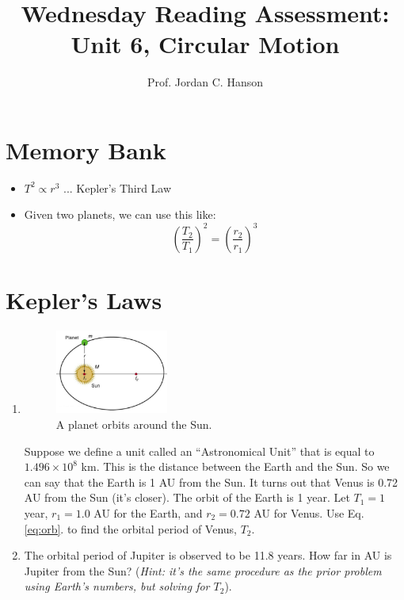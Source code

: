 \documentclass{article}
\begin{document}
\title{Wednesday Reading Assessment: Unit 6, Circular Motion}
\author{Prof. Jordan C. Hanson}

\maketitle

\section{Memory Bank}

\begin{itemize}
\item $T^2 \propto r^3$ ... Kepler's Third Law
\item Given two planets, we can use this like:
\begin{equation}
\left(\frac{T_2}{T_1}\right)^2 = \left(\frac{r_2}{r_1}\right)^3 \label{eq:orb}
\end{equation}
\end{itemize}

\section{Kepler's Laws}

\begin{enumerate}
\item
\begin{figure}[ht]
\centering
\includegraphics[width=0.35\textwidth]{orbit.png}
\caption{\label{fig:orbit} A planet orbits around the Sun.}
\end{figure}
Suppose we define a unit called an ``Astronomical Unit'' that is equal to $1.496\times 10^8$ km.  This is the distance between the Earth and the Sun.  So we can say that the Earth is 1 AU from the Sun.  It turns out that Venus is 0.72 AU from the Sun (it's closer).  The orbit of the Earth is 1 year.  Let $T_1 = 1$ year, $r_1 = 1.0$ AU for the Earth, and $r_2 = 0.72$ AU for Venus.  Use Eq. \ref{eq:orb}. to find the orbital period of Venus, $T_2$. \\ \vspace{3cm}
\item The orbital period of Jupiter is observed to be 11.8 years.  How far in AU is Jupiter from the Sun?  (\textit{Hint: it's the same procedure as the prior problem using Earth's numbers, but solving for $T_2$}).
\end{enumerate}
\end{document}
